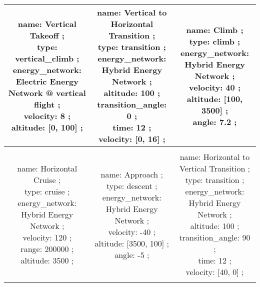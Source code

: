 \begin{table}[h]
\begin{adjustbox}{width=1\textwidth}
\begin{tabular}{|c|c|c|}
\makecell{name: Vertical Takeoff ; \\ type: vertical\_climb ; \\ energy\_network: Electric Energy Network @ vertical flight ; \\ velocity: 8 ; \\ altitude: [0, 100] ; \\ } & \makecell{name: Vertical to Horizontal Transition ; \\ type: transition ; \\ energy\_network: Hybrid Energy Network ; \\ altitude: 100 ; \\ transition\_angle: 0 ; \\ time: 12 ; \\ velocity: [0, 16] ; \\ } & \makecell{name: Climb ; \\ type: climb ; \\ energy\_network: Hybrid Energy Network ; \\ velocity: 40 ; \\ altitude: [100, 3500] ; \\ angle: 7.2 ; \\ }\\ \hline \\ 
\makecell{name: Horizontal Cruise ; \\ type: cruise ; \\ energy\_network: Hybrid Energy Network ; \\ velocity: 120 ; \\ range: 200000 ; \\ altitude: 3500 ; \\ } & \makecell{name: Approach ; \\ type: descent ; \\ energy\_network: Hybrid Energy Network ; \\ velocity: -40 ; \\ altitude: [3500, 100] ; \\ angle: -5 ; \\ } & \makecell{name: Horizontal to Vertical Transition ; \\ type: transition ; \\ energy\_network: Hybrid Energy Network ; \\ altitude: 100 ; \\ transition\_angle: 90 ; \\ time: 12 ; \\ velocity: [40, 0] ; \\ }\\ \hline \\ 

\end{tabular}
\end{adjustbox}
\end{table}

